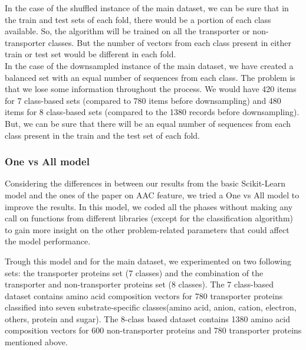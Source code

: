     In the case of the shuffled instance of the main dataset, we can be sure that in the train and test sets of 
    each fold, there would be a portion of each class available. So, the algorithm will be trained on all the 
    transporter or non-transporter classes. But the number of vectors from each class present in either train or 
    test set would be different in each fold.\\

    In the case of the downsampled instance of the main dataset, we have created a balanced set with an equal number of 
    sequences from each class. The problem is that we lose some information throughout the process. We would have 420 items 
    for 7 class-based sets (compared to 780 items before downsampling) and 480 items for 8 class-based sets 
    (compared to the 1380 records before downsampling). But, we can be sure that there will be an equal number of sequences 
    from each class present in the train and the test set of each fold.\\

    
    

    \subsubsection{One vs All model}
    Considering the differences in between our results from the basic Scikit-Learn model and the ones of 
    the paper on AAC feature, we tried a One vs All model to improve the results. In this model, we coded all 
    the phases without making any call on functions from different libraries (except for the classification algorithm) 
    to gain more insight on the other problem-related parameters that could affect the model performance.\\

    
    Trough this model and for the main dataset, we experimented on two following sets: the transporter proteins set 
    (7 classes) and the combination of the transporter and non-transporter proteins set (8 classes). 
    The 7 class-based dataset contains amino acid composition vectors for 780 transporter proteins classified into 
    seven substrate-specific classes(amino acid, anion, cation, electron, others, protein and sugar). 
    The 8-class based dataset contains 1380 amino acid composition vectors for 600 non-transporter proteins and 
    780 transporter proteins mentioned above.\\

